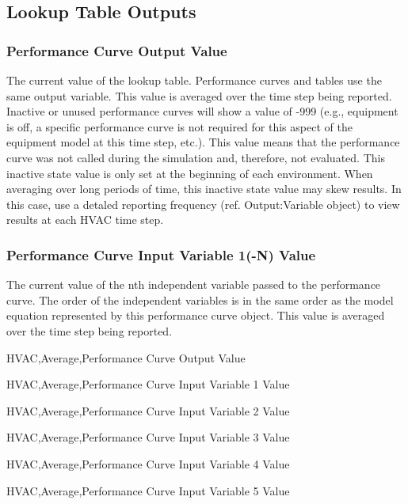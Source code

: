 \subsection{Lookup Table Outputs}\label{lookup-table-outputs}

\subsubsection{\texorpdfstring{Performance Curve Output Value \protect\hyperlink{section-1}{}}{Performance Curve Output Value }}\label{performance-curve-output-value-2}

The current value of the lookup table. Performance curves and tables use the same output variable. This value is averaged over the time step being reported. Inactive or unused performance curves will show a value of -999 (e.g., equipment is off, a specific performance curve is not required for this aspect of the equipment model at this time step, etc.). This value means that the performance curve was not called during the simulation and, therefore, not evaluated. This inactive state value is only set at the beginning of each environment. When averaging over long periods of time, this inactive state value may skew results. In this case, use a detaled reporting frequency (ref. Output:Variable object) to view results at each HVAC time step.

\subsubsection{\texorpdfstring{Performance Curve Input Variable 1(-N) Value \protect\hyperlink{section-1}{}}{Performance Curve Input Variable 1(-N) Value }}\label{performance-curve-input-variable-1-n-value-000}

The current value of the nth independent variable passed to the performance curve. The order of the independent variables is in the same order as the model equation represented by this performance curve object. This value is averaged over the time step being reported.

HVAC,Average,Performance Curve Output Value \protect\hyperlink{section-1}{}

HVAC,Average,Performance Curve Input Variable 1 Value \protect\hyperlink{section-1}{}

HVAC,Average,Performance Curve Input Variable 2 Value \protect\hyperlink{section-1}{}

HVAC,Average,Performance Curve Input Variable 3 Value \protect\hyperlink{section-1}{}

HVAC,Average,Performance Curve Input Variable 4 Value \protect\hyperlink{section-1}{}

HVAC,Average,Performance Curve Input Variable 5 Value \protect\hyperlink{section-1}{}
